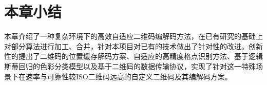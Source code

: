 \section{本章小结}

本章介绍了一种复杂环境下的高效自适应二维码编解码方法，在已有研究的基础上对部分算法进行加工、合并，针对本项目对已有的技术做出了针对性的改进。创新性的提出了二维码的位置缓存解码方案、自适应的高精度格点识别方法、基于逻辑斯蒂回归的色彩分类模型以及基于二维码的数据传输协议，实现了针对这一特殊场景下在速率与可靠性较ISO二维码远高的自定义二维码及其编解码方案。